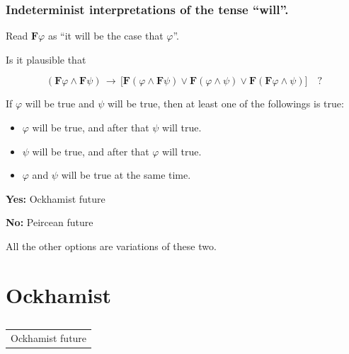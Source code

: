 \documentclass[xcolor=x11names]{beamer}
\makeatletter
\let\beamer@writeslidentry@miniframeson=\beamer@writeslidentry
\def\beamer@writeslidentry@miniframesoff{%
  \expandafter\beamer@ifempty\expandafter{\beamer@framestartpage}{}%
  {%
    \clearpage\beamer@notesactions%
  }
}
\newcommand*{\miniframeson}{\let\beamer@writeslidentry=\beamer@writeslidentry@miniframeson}
\newcommand*{\miniframesoff}{\let\beamer@writeslidentry=\beamer@writeslidentry@miniframesoff}
\newcommand{\cimdia}[1] {\miniframesoff \begin{frame}\begin{center}\huge \begin{tabular}{c}#1\end{tabular}\end{center}\end{frame}\miniframeson}
\newcommand{\szakasz}[2][]{\section{#1}\subsection{}\cimdia{#2}}
\newcommand{\FD}{\mathbf F}
\newcommand{\lthen}{\rightarrow}
\makeatother
\begin{document}
\begin{frame}
	\frametitle{\large Indeterminist interpretations of the tense ``will''.}
\footnotesize

Read $\FD \varphi$ as ``it will be the case that $\varphi$''.

Is it plausible that

{\large
\[ (\FD \varphi \land \FD \psi)\, \lthen \, \big[ \FD(\varphi \land \FD \psi) \lor \FD(\varphi \land \psi) \lor \FD(\FD \varphi \land \psi)\big] \quad ? \]
}

{\scriptsize If $\varphi$ will be true and $\psi$ will be true, then at least one of the followings is true:
\begin{itemize}
\item $\varphi$ will be true, and after that $\psi$ will true.
\item $\psi$ will be true, and after that $\varphi$ will true.
\item $\varphi$ and $\psi$ will be true at the same time.
\end{itemize}}

\bigskip

\pause %

\textbf{Yes:} Ockhamist future

\bigskip

\pause %

\textbf{No:} Peircean future

\bigskip

All the other options are variations of these two.
\end{frame}


\szakasz[Ockhamist]{Ockhamist future}
\end{document}
